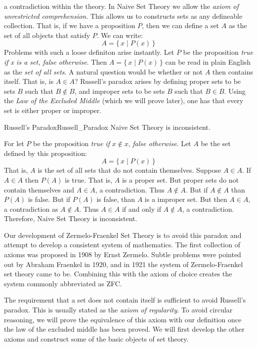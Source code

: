     a contradiction within the theory. In Naive Set Theory we allow the
    \textit{axiom of unrestricted comprehension}. This allows us to
    constructs sets as any defineable collection. That is, if we have a
    proposition $P$, then we can define a set $A$ as the set of all objects
    that satisfy $P$. We can write:
    \begin{equation}
        A=\{\,x\;|\;P(x)\,\}
    \end{equation}
    Problems with such a loose definiton arise instantly. Let $P$ be the
    proposition \textit{true if x is a set, false otherwise}. Then
    $A=\{\,x\;|\;P(x)\,\}$ can be read in plain English as the
    \textit{set of all sets}. A natural question would be whether or not
    $A$ then contains itself. That is, is $A\in{A}$? Russell's paradox
    arises by defining proper sets to be sets $B$ such that $B\notin{B}$,
    and improper sets to be sets $B$ such that $B\in{B}$. Using the
    \textit{Law of the Excluded Middle} (which we will prove later), one
    has that every set is either proper or improper.
    \begin{ftheorem}{Russell's Paradox}{Russell_Paradox}
        Naive Set Theory is inconsistent.
    \end{ftheorem}
    \begin{bproof}
        For let $P$ be the proposition
        \textit{true if} $x\notin{x}$, \textit{false otherwise}.
        Let $A$ be the set defined by this proposition:
        \begin{equation}
            A=\{\,x\;|\;P(x)\,\}
        \end{equation}
        That is, $A$ is the set of all sets that do not contain themselves.
        Suppose $A\in{A}$. If $A\in{A}$ then $P(A)$ is true. That is, $A$ is a
        proper set. But proper sets do not contain themselves and $A\in{A}$, a
        contradiction. Thus $A\notin{A}$. But if $A\notin{A}$ than $P(A)$ is
        false. But if $P(A)$ is false, than $A$ is a improper set. But then
        $A\in{A}$, a contradiction as $A\notin{A}$. Thus $A\in{A}$ if and only
        if $A\notin{A}$, a contradiction. Therefore, Naive Set Theory is
        inconsistent.
    \end{bproof}
    Our development of Zermelo-Fraenkel Set Theory is to avoid this
    paradox and attempt to develop a consistent system of mathematics.
    The first collection of axioms was proposed in 1908 by Ernst
    Zermelo. Subtle problems were pointed out by Abraham Fraenkel
    in 1920, and in 1921 the system of Zermelo-Fraenkel set theory came
    to be. Combining this with the axiom of choice creates the system
    commonly abbreviated as ZFC.
    \par\hfill\par
    The requirement that a set does not contain itself is sufficient to
    avoid Russell's paradox. This is usually stated as the
    \textit{axiom of regularity}. To avoid circular reasoning, we will
    prove the equivalence of this axiom with our definition once the law
    of the excluded middle has been proved. We will first develop the
    other axioms and construct some of the basic objects of set theory.
